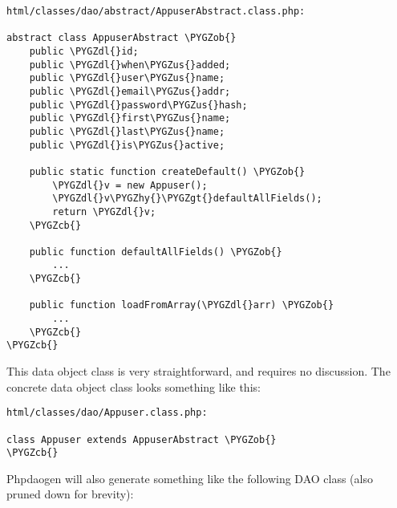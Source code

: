 \documentclass[letterpaper,10pt,english]{sphinxmanual}
\def\PYGZus{\char`\_}
\def\PYGZob{\char`\{}
\def\PYGZcb{\char`\}}
\def\PYGZgt{\char`\>}
\def\PYGZdl{\char`\$}
\def\PYGZhy{\char`\-}
\begin{document}
\begin{Verbatim}[commandchars=\\\{\}]
html/classes/dao/abstract/AppuserAbstract.class.php:

abstract class AppuserAbstract \PYGZob{}
    public \PYGZdl{}id;
    public \PYGZdl{}when\PYGZus{}added;
    public \PYGZdl{}user\PYGZus{}name;
    public \PYGZdl{}email\PYGZus{}addr;
    public \PYGZdl{}password\PYGZus{}hash;
    public \PYGZdl{}first\PYGZus{}name;
    public \PYGZdl{}last\PYGZus{}name;
    public \PYGZdl{}is\PYGZus{}active;

    public static function createDefault() \PYGZob{}
        \PYGZdl{}v = new Appuser();
        \PYGZdl{}v\PYGZhy{}\PYGZgt{}defaultAllFields();
        return \PYGZdl{}v;
    \PYGZcb{}

    public function defaultAllFields() \PYGZob{}
        ...
    \PYGZcb{}

    public function loadFromArray(\PYGZdl{}arr) \PYGZob{}
        ...
    \PYGZcb{}
\PYGZcb{}
\end{Verbatim}

This data object class is very straightforward, and requires no discussion.  The concrete data object
class looks something like this:

\begin{Verbatim}[commandchars=\\\{\}]
html/classes/dao/Appuser.class.php:

class Appuser extends AppuserAbstract \PYGZob{}
\PYGZcb{}
\end{Verbatim}

Phpdaogen will also generate something like the following DAO class (also pruned down for brevity):
\end{document}
